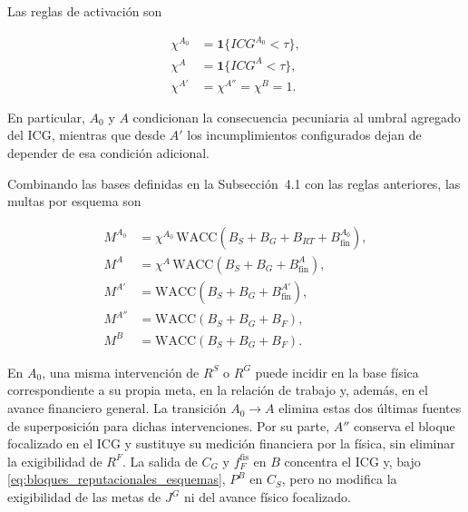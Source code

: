 Las reglas de activación son

\begin{subequations}
\label{eq:activacion_esquemas}
\begin{align}
\chi^{A_0}
&=
\mathbf{1}\{ICG^{A_0}<\tau\},
\label{eq:chi_a0}
\\
\chi^{A}
&=
\mathbf{1}\{ICG^{A}<\tau\},
\label{eq:chi_a}
\\
\chi^{A'}
&=
\chi^{A''}
=
\chi^{B}
=
1.
\label{eq:chi_sin_umbral}
\end{align}
\end{subequations}

En particular, \(A_0\) y \(A\) condicionan la consecuencia pecuniaria al umbral agregado del ICG, mientras que desde \(A'\) los incumplimientos configurados dejan de depender de esa condición adicional.

Combinando las bases definidas en la Subsección~4.1 con las reglas anteriores, las multas por esquema son

\begin{subequations}
\label{eq:multas_esquemas}
\begin{align}
M^{A_0}
&=
\chi^{A_0}\,
\mathrm{WACC}
\left(
B_S+B_G+B_{RT}+B_{\mathrm{fin}}^{A_0}
\right),
\label{eq:multa_base_a0}
\\
M^{A}
&=
\chi^{A}\,
\mathrm{WACC}
\left(
B_S+B_G+B_{\mathrm{fin}}^{A}
\right),
\label{eq:multa_a}
\\
M^{A'}
&=
\mathrm{WACC}
\left(
B_S+B_G+B_{\mathrm{fin}}^{A'}
\right),
\label{eq:multa_ap}
\\
M^{A''}
&=
\mathrm{WACC}
\left(
B_S+B_G+B_F
\right),
\label{eq:multa_app}
\\
M^{B}
&=
\mathrm{WACC}
\left(
B_S+B_G+B_F
\right).
\label{eq:multa_b}
\end{align}
\end{subequations}

En \(A_0\), una misma intervención de \(R^{S}\) o \(R^{G}\) puede incidir en la base física correspondiente a su propia meta, en la relación de trabajo y, además, en el avance financiero general. La transición \(A_0\to A\) elimina estas dos últimas fuentes de superposición para dichas intervenciones. Por su parte, \(A''\) conserva el bloque focalizado en el ICG y sustituye su medición financiera por la física, sin eliminar la exigibilidad de \(R^{F}\). La salida de \(C_G\) y \(f_F^{\mathrm{fis}}\) en \(B\) concentra el ICG y, bajo \eqref{eq:bloques_reputacionales_esquemas}, \(P^B\) en \(C_S\), pero no modifica la exigibilidad de las metas de \(J^{G}\) ni del avance físico focalizado.

